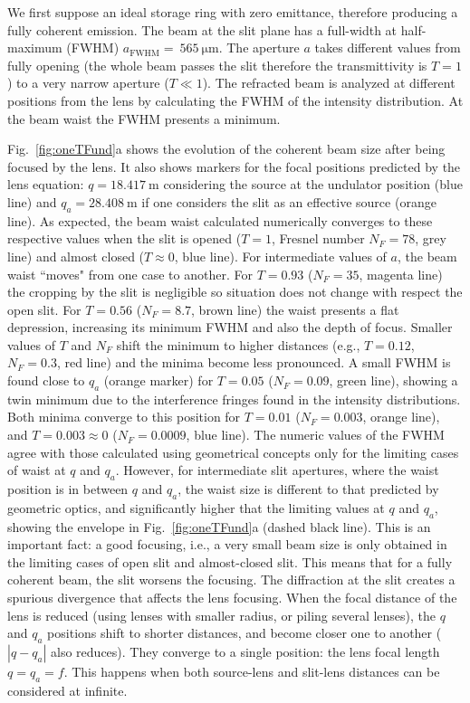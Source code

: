 \documentclass[9pt,twocolumn,twoside]{osajnl}
\begin{document}
We first suppose an ideal storage ring with zero emittance, therefore producing a fully coherent emission. The beam at the slit plane has a full-width at half-maximum (FWHM) $a_\text{FWHM}=~\SI{565}{\micro\meter}$. The aperture $a$ takes different values from fully opening (the whole beam passes the slit therefore the transmittivity is $T=1$) to a very narrow aperture ($T\ll1$). The refracted beam is analyzed at different positions from the lens by calculating the FWHM of the intensity distribution. At the beam waist the FWHM presents a minimum. 

Fig.~\ref{fig:oneTFund}a shows the evolution of the coherent beam size after being focused by the lens. It also shows markers for the focal positions predicted by the lens equation:  $q=\SI{18.417}{\meter}$ considering the source at the undulator position (blue line) and $q_a=\SI{28.408}{\meter}$ if one considers the slit as an effective source (orange line). As expected, the beam waist calculated numerically converges to these respective values when the slit is opened ($T=1$, Fresnel number $N_F=78$, grey line) and almost closed ($T\approx0$, blue line). For intermediate values of $a$, the beam waist ``moves" from one case to another. For $T=0.93$ ($N_F=35$, magenta line) the cropping by the slit is negligible so situation does not change with respect the open slit. For $T=0.56$ ($N_F=8.7$, brown line) the waist presents a flat depression, increasing its minimum FWHM and also the depth of focus. Smaller values of $T$ and $N_F$ shift the minimum to higher distances (e.g., $T=0.12$, $N_F=0.3$,  red line) and the minima become less pronounced. A small FWHM is found close to $q_a$ (orange marker) for $T=0.05$ ($N_F=0.09$, green line), showing a twin minimum due to the interference fringes found in the intensity distributions. Both minima converge to this position for $T=0.01$ ($N_F=0.003$, orange line), and $T=0.003\approx0$ ($N_F=0.0009$, blue line). 
The numeric values of the FWHM agree with those calculated using geometrical concepts only for the limiting cases of waist at $q$ and $q_a$. 
However, for intermediate slit apertures, where the waist position is in between $q$ and $q_a$, the waist size is different to that predicted by geometric optics, and significantly higher that the limiting values at $q$ and $q_a$, showing the envelope in Fig.~\ref{fig:oneTFund}a (dashed black line).
This is an important fact: a good focusing, i.e., a very small beam size is only obtained in the limiting cases of open slit and almost-closed slit. This means that for a fully coherent beam, the slit worsens the focusing. The diffraction at the slit creates a spurious divergence that affects the lens focusing. 
When the focal distance of the lens is reduced (using lenses with smaller radius, or piling several lenses), the $q$ and $q_a$ positions shift to shorter distances, and become closer one to another ($|q-q_a|$ also reduces). They converge to a single position: the lens focal length $q=q_a=f$. This happens when both source-lens and slit-lens distances can be considered at infinite. 
\end{document}
